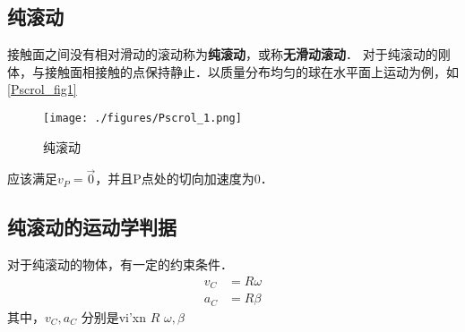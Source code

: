 \begin{issues}
\issueDraft
\issueTODO
\end{issues}

\subsection{纯滚动}
接触面之间没有相对滑动的滚动称为\textbf{纯滚动}，或称\textbf{无滑动滚动}．
对于纯滚动的刚体，与接触面相接触的点保持静止．以质量分布均匀的球在水平面上运动为例，如\autoref{Pscrol_fig1}
\begin{figure}[ht]
\centering
\texttt{[image: ./figures/Pscrol\_1.png]}
\caption{纯滚动} \label{Pscrol_fig1}
\end{figure}
应该满足$v_P=\vec 0$，并且P点处的切向加速度为0．

\subsection{纯滚动的运动学判据}
对于纯滚动的物体，有一定的约束条件．
\begin{align}
v_C&=R\omega\\
a_C&=R\beta
\end{align}
其中，$v_C,a_C$
分别是vi'xn
$R$
$\omega,\beta$